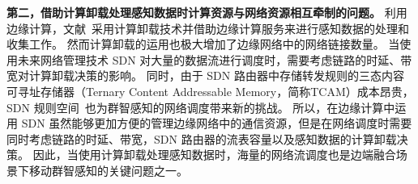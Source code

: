 
\textbf{第二，借助计算卸载处理感知数据时计算资源与网络资源相互牵制的问题。}
利用边缘计算，文献~采用计算卸载技术并借助边缘计算服务来进行感知数据的处理和收集工作。
然而计算卸载的运用也极大增加了边缘网络中的网络链接数量。
当使用未来网络管理技术 SDN 对大量的数据流进行调度时，需要考虑链路的时延、带宽对计算卸载决策的影响。
同时，由于 SDN 路由器中存储转发规则的三态内容可寻址存储器（Ternary Content Addressable Memory，简称TCAM）成本昂贵，SDN 规则空间~\cite{Katta:2014es}也为群智感知的网络调度带来新的挑战。
所以，在边缘计算中运用 SDN 虽然能够更加方便的管理边缘网络中的通信资源，但是在网络调度时需要同时考虑链路的时延、带宽，SDN 路由器的流表容量以及感知数据的计算卸载决策。
因此，当使用计算卸载处理感知数据时，海量的网络流调度也是边端融合场景下移动群智感知的关键问题之一。



